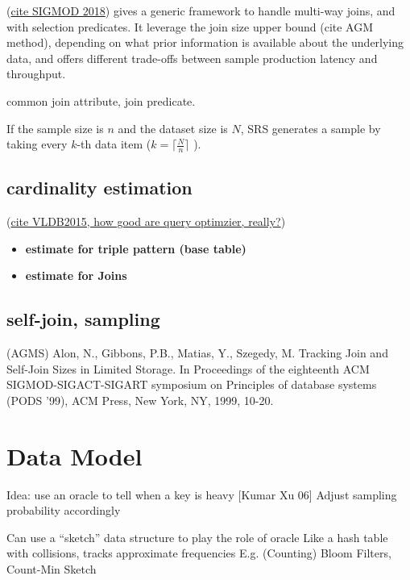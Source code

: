 \documentclass[runningheads]{llncs}
\begin{document}
(\underline{cite SIGMOD 2018}) gives a generic framework to handle multi-way joins, and with selection predicates. It leverage the join size upper bound (cite AGM method), depending on what prior information is available about the underlying data, and offers different trade-offs between sample production latency and throughput.

common join attribute, join predicate.

If the sample size is $n$ and the dataset size is $N$, SRS generates a sample by taking every $k$-th data item ($k=\lceil\frac{N}{n}\rceil$ ). 

\subsection{cardinality estimation}

(\underline{cite  VLDB2015, how good are query optimzier, really?})

\begin{itemize}
	\item \textbf{estimate for triple pattern (base table)}
	\item \textbf{estimate for Joins}
\end{itemize}

\subsection{self-join, sampling}

(AGMS) Alon, N., Gibbons, P.B., Matias, Y., Szegedy, M. Tracking
Join and Self-Join Sizes in Limited Storage. In Proceedings
of the eighteenth ACM SIGMOD-SIGACT-SIGART
symposium on Principles of database systems (PODS '99),
ACM Press, New York, NY, 1999, 10-20. 

%
%

\section{Data Model}

Idea: use an oracle to tell when a key is heavy [Kumar Xu 06] 
Adjust sampling probability accordingly

Can use a “sketch” data structure to play the role of oracle
Like a hash table with collisions, tracks approximate frequencies
E.g. (Counting) Bloom Filters, Count-Min Sketch
\end{document}
